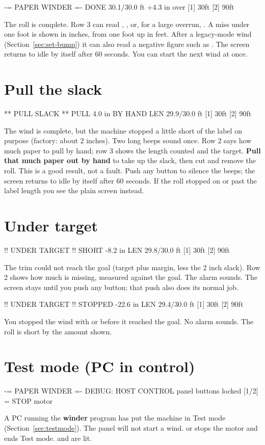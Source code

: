 \begin{lcd}
 -= PAPER WINDER =-
DONE 30.1/30.0 ft
+4.3 in over
[1] 30ft    [2] 90ft
\end{lcd}
The roll is complete. Row 3 can read ,
, or, for a large overrun, . A miss under one foot is
shown in inches, from one foot up in feet. After a
legacy-mode wind (Section~\ref{sec:set-bump}) it can also read a
negative figure such as . The screen returns to idle by
itself after 60 seconds. You can start the next wind at once.

\section{Pull the slack}\label{sec:screen-slack}
\begin{lcd}
  ** PULL SLACK **
PULL 4.0 in BY HAND
LEN 29.9/30.0 ft
[1] 30ft    [2] 90ft
\end{lcd}
The wind is complete, but the machine stopped a little short of the label on
purpose (factory: about 2 inches). Two long beeps sound once. Row 2 says how
much paper to pull by hand; row 3 shows the length counted and the target.
\textbf{Pull that much paper out by hand} to take up the slack, then cut and
remove the roll. This is a good result, not a fault. Push any button to
silence the beeps; the screen returns to idle by itself after 60 seconds.
If the roll stopped on or past the label length you see the plain
 screen instead.

\section{Under target}\label{sec:screen-under}
\begin{lcd}
 !! UNDER TARGET !!
SHORT -8.2 in
LEN 29.8/30.0 ft
[1] 30ft    [2] 90ft
\end{lcd}
The trim could not reach the goal (target plus margin, less the 2 inch slack). Row 2 shows how much
is missing, measured against the goal. The alarm sounds. The screen stays
until you push any button; that push also does its normal job.

\begin{lcd}
 !! UNDER TARGET !!
STOPPED -22.6 in
LEN 29.4/30.0 ft
[1] 30ft    [2] 90ft
\end{lcd}
You stopped the wind with  or  before it reached the goal. No
alarm sounds. The roll is short by the amount shown.

\section{Test mode (PC in control)}\label{sec:screen-test}
\begin{lcd}
 -= PAPER WINDER =-
DEBUG: HOST CONTROL
panel buttons locked
[1/2] = STOP motor
\end{lcd}
A PC running the \textbf{winder} program has put the machine in Test mode
(Section~\ref{sec:testmode}). The panel will not start a wind.  or
 stops the motor and ends Test mode.  and  are lit.
